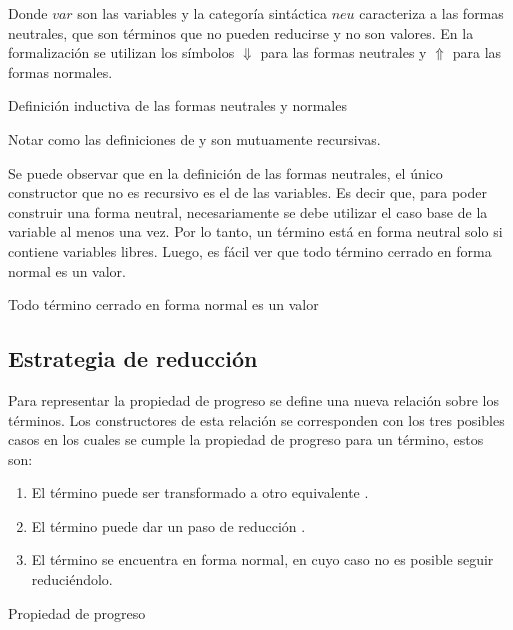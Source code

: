 Donde $var$ son las variables y la categoría sintáctica $neu$ caracteriza a las formas neutrales, que son términos que no pueden reducirse y no son valores.
En la formalización se utilizan los símbolos $\Downarrow$ para las formas neutrales y $\Uparrow$ para las formas normales.

\begin{codigo}
	Definición inductiva de las formas neutrales y normales
\end{codigo}

Notar como las definiciones de \type{$\Uparrow$} y \type{$\Downarrow$} son mutuamente recursivas.

Se puede observar que en la definición de las formas neutrales, el único constructor que no es recursivo es el de las variables.
Es decir que, para poder construir una forma neutral, necesariamente se debe utilizar el caso base de la variable al menos una vez.
Por lo tanto, un término está en forma neutral solo si contiene variables libres.
Luego, es fácil ver que todo término cerrado en forma normal es un valor.

\begin{codigo}
	Todo término cerrado en forma normal es un valor
\end{codigo}

\subsection{Estrategia de reducción}

Para representar la propiedad de progreso se define una nueva relación  sobre los términos.
Los constructores de esta relación se corresponden con los tres posibles casos en los cuales se cumple la propiedad de progreso para un término, estos son:
\begin{enumerate}
	\item El término puede ser transformado a otro equivalente \type{$\_\rightleftarrows\_$}.
	\item El término puede dar un paso de reducción \type{$\_\hookrightarrow\_$}.
	\item El término se encuentra en forma normal, en cuyo caso no es posible seguir reduciéndolo.
\end{enumerate}

\begin{codigo}
	Propiedad de progreso
\end{codigo}

